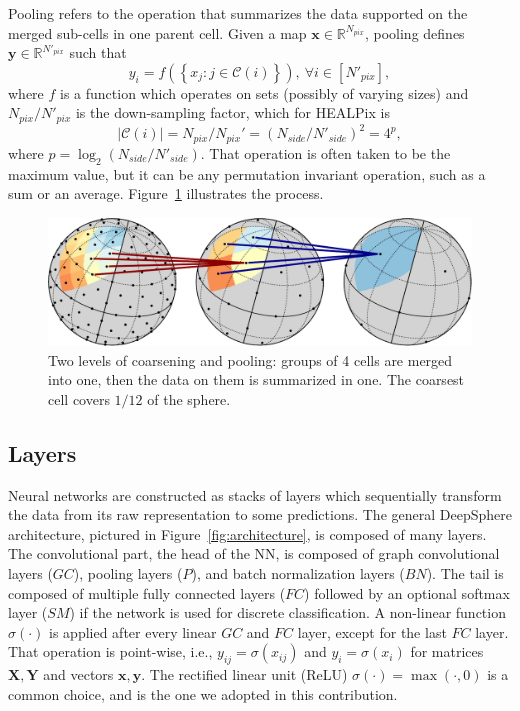 \documentclass[final,twocolumn,3p,times,sort&compress]{elsarticle}
\newcommand{\figref}[1]{Figure~\ref{fig:#1}}
\renewcommand{\b}[1]{{\bm{#1}}}   %
\newcommand{\1}{\b{1}}              %
\newcommand{\0}{\b{0}}              %
\newcommand{\C}{\mathcal{C}}
\newcommand{\x}{\b{x}}
\newcommand{\X}{\b{X}}
\newcommand{\y}{\b{y}}
\newcommand{\Y}{\b{Y}}
\newcommand{\R}{\mathbb{R}}
\begin{document}
Pooling refers to the operation that summarizes the data supported on the merged sub-cells in one parent cell.
Given a map $\x \in \R^{N_{pix}}$, pooling defines $\y \in \R^{N'_{pix}}$ such that
\begin{equation} \label{eqn:pooling}
	y_i = f \left( \left\{ x_j : j \in \C(i) \right\} \right), \ \forall i \in [N'_{pix}],
\end{equation}
where $f$ is a function which operates on sets (possibly of varying sizes) and $N_{pix} / {N'_{pix}}$ is the down-sampling factor, which for HEALPix is
\begin{equation*}
| \C(i) | = N_{pix} / {N_{pix}}' = (N_{side} / N'_{side})^2 = 4^p,
\end{equation*}
where $p=\log_2(N_{side} / N'_{side})$.
That operation is often taken to be the maximum value, but it can be any permutation invariant operation, such as a sum or an average.
\figref{pooling} illustrates the process.


\begin{figure}[t!]
	\centering
	\includegraphics[width=\linewidth]{figure_pooling_svg}
	\caption{Two levels of coarsening and pooling: groups of 4 cells are merged into one, then the data on them is summarized in one. The coarsest cell covers $1/12$ of the sphere.}
	\label{fig:pooling}
\end{figure}

\subsection{Layers}

Neural networks are constructed as stacks of layers which sequentially transform the data from its raw representation to some predictions.
The general DeepSphere architecture, pictured in \figref{architecture}, is composed of many layers. The convolutional part, the head of the NN, is composed of graph convolutional layers ($GC$), pooling layers ($P$), and batch normalization layers ($BN$). The tail is composed of multiple fully connected layers ($FC$) followed by an optional softmax layer ($SM$) if the network is used for discrete classification.
A non-linear function $\sigma(\cdot)$ is applied after every linear $GC$ and $FC$ layer, except for the last $FC$ layer.
That operation is point-wise, i.e., $y_{ij} = \sigma(x_{ij})$ and $y_i = \sigma(x_i)$ for matrices $\X, \Y$ and vectors $\x, \y$.
The rectified linear unit (ReLU) $\sigma(\cdot) = \max(\cdot, 0)$ is a common choice, and is the one we adopted in this contribution.
\end{document}
